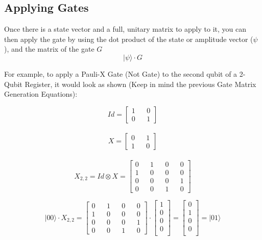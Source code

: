 \documentclass[../main.tex]{subfiles}
\begin{document}
\subsection{Applying Gates}
Once there is a state vector and a full, unitary matrix to apply to it,
you can then apply the gate by using the dot product of the state or amplitude vector (\(\psi\)), and the matrix of the gate \(G\) \\
\begin{equation}
	\lvert\psi\rangle \cdot G
\end{equation}

For example, to apply a Pauli-X Gate (Not Gate) to the second qubit of a 2-Qubit Register, it would look as shown (Keep in mind the previous Gate Matrix Generation Equations):

$$
	Id = \left [\begin{matrix}
		1 && 0 \\
		0 && 1
	\end{matrix}\right]
$$
	\\
$$
	X = \left [\begin{matrix}
		0 && 1 \\
		1 && 0
	\end{matrix}\right]
$$
	\\
$$	
	X_{2,2} = Id \otimes X = \left [\begin{matrix}
		0 && 1 && 0 && 0 \\
		1 && 0 && 0 && 0 \\
		0 && 0 && 0 && 1 \\
		0 && 0 && 1 && 0
	\end{matrix}\right]
$$	

$$
\lvert00\rangle \cdot X_{2,2} = \left[\begin{matrix}
		0 && 1 && 0 && 0 \\
		1 && 0 && 0 && 0 \\
		0 && 0 && 0 && 1 \\
		0 && 0 && 1 && 0
\end{matrix}\right] \cdot \left[\begin{matrix}
	1 \\
	0 \\
	0 \\
	0 \\
\end{matrix}\right] = \left[\begin{matrix}
	0 \\
	1 \\
	0 \\
	0 \\
\end{matrix}\right] = \lvert01\rangle
$$
		
\end{document}
